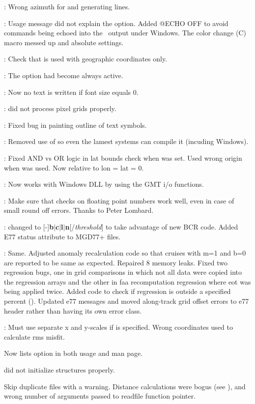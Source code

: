 \begin{description}
\item []: Wrong azimuth for  and  generating lines.
\item []: Usage message did not explain the  option.  Added @ECHO OFF to avoid
commands being echoed into the \PS\ output under Windows.
The color change (C) macro messed up  and  absolute settings.
\item []: Check that  is used with geographic coordinates only.
\item []: The  option had become always active.
\item []: Now no text is written if font size equals 0.
\item []:  did not process pixel grids properly.
\item []: Fixed bug in painting outline of text symbols.
\item []: Removed use of  so even the lamest systems can compile it (incuding
Windows).
\item []: Fixed AND vs OR logic in lat bounds check when  was set.
Used wrong origin when  was used.  Now relative to lon = lat = 0.
\item []: Now works with Windows DLL by using the GMT i/o functions.
\item []: Make sure that checks on floating point numbers work well, even
in case of small round off errors. Thanks to Peter Lombard.
\item []:  changed to [-]{\bf b$|$c$|$l$|$n}[/{\it threshold}] to
take advantage of new BCR code.  Added E77 status attribute to MGD77+ files.
\item []: Same.  Adjusted anomaly recalculation code so that
cruises with m=1 and b=0 are reported to be same as expected.  Repaired 8 memory leaks. Fixed
two regression bugs, one in grid comparisons in which not all data were copied into the regression
arrays and the other in faa recomputation regression where eot was being applied twice.
Added code to check if regression is outside a specified percent ().
Updated e77 messages and moved along-track grid offset errors to e77 header rather than having its own error class.
\item []: Must use separate x and y-scales if  is specified.
Wrong coordinates used to calculate rms misfit.
\item {} Now lists option  in both usage and man page.
\item {}  did not initialize structures properly.
\item {} Skip duplicate files with a warning. Distance calculations
were bogus (see ), and wrong number of arguments passed to readfile function pointer.
\end{description}


